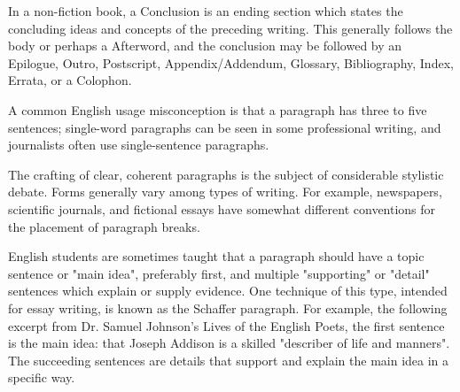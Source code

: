 In a non-fiction book, a Conclusion is an ending section which states the concluding ideas and concepts of the preceding writing. This generally follows the body or perhaps a Afterword, and the conclusion may be followed by an Epilogue, Outro, Postscript, Appendix/Addendum, Glossary, Bibliography, Index, Errata, or a Colophon.

A common English usage misconception is that a paragraph has three to five sentences; single-word paragraphs can be seen in some professional writing, and journalists often use single-sentence paragraphs.

The crafting of clear, coherent paragraphs is the subject of considerable stylistic debate. Forms generally vary among types of writing. For example, newspapers, scientific journals, and fictional essays have somewhat different conventions for the placement of paragraph breaks.

English students are sometimes taught that a paragraph should have a topic sentence or "main idea", preferably first, and multiple "supporting" or "detail" sentences which explain or supply evidence. One technique of this type, intended for essay writing, is known as the Schaffer paragraph. For example, the following excerpt from Dr. Samuel Johnson's Lives of the English Poets, the first sentence is the main idea: that Joseph Addison is a skilled "describer of life and manners". The succeeding sentences are details that support and explain the main idea in a specific way.